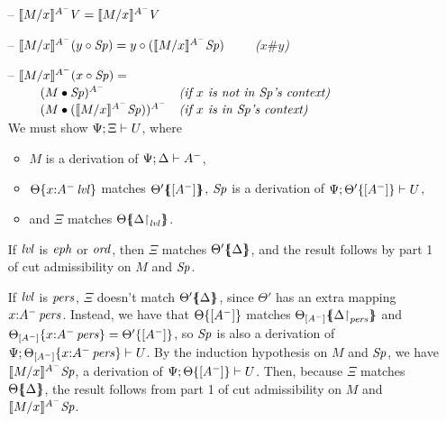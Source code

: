\begin{itemize}
\item[--] $\rsubsta{M}{x}{\tfocusr{V}}{A^-} 
           = \tfocusr{\rsubsta{M}{x}{V}{A^-}}$
\item[--] $\rsubsta{M}{x}{(\tfocusl{y}{\Sp})}{A^-} 
           = \tfocusl{y}{(\rsubsta{M}{x}{\Sp}{A^-})} \qquad$ {\it ($x \# y$)}
\item[--] $\rsubsta{M}{x}{(\tfocusl{x}{\Sp})}{A^-} =$\\
    $\begin{array}{ll}
    \qquad (\subst{M}{\Sp})^{A^-}
     & \mbox{\it (if $x$ is not in $\Sp$'s context)}\\
    \qquad (\subst{M}{(\rsubsta{M}{x}{\Sp}{A^-})})^{A^-}
     & \mbox{\it (if $x$ is in $\Sp$'s context)}
    \end{array}$\smallskip\\
  We must show $\foc{\Psi}{\Xi}{U}$, where
  \begin{itemize}
  \item $M$ is a derivation of $\foc{\Psi}{\Delta}{A^-}$, 
  \item $\tackon{\Theta}{x{:}\islvl{A^-}}$ matches
     $\frameoff{\Theta'}{[A^-]}$, 
     $\Sp$ is a derivation of 
     $\foc{\Psi}{\tackon{\Theta'}{[A^-]}}{U}$,
  \item and $\Xi$ matches $\frameoff{\Theta}{\restrictto{\Delta}{\mlvl}}$.
  \end{itemize}
  If $\mlvl$ is $\meph$ or $\mtrue$, then 
  $\Xi$ matches $\frameoff{\Theta'}{\Delta}$, and the result follows by
  part 1 of cut admissibility on $M$ and $\Sp$. 

  If $\mlvl$ is $\mpers$, $\Xi$ doesn't match $\frameoff{\Theta'}{\Delta}$,
  since $\Theta'$ has an extra mapping $x{:}\ispers{A^-}$. Instead,
  we have that 
    $\tackon{\Theta}{[A^-]}$ matches 
   $\frameoff{\Theta_{[A^-]}}{\restrictto{\Delta}{\mpers}}$
  and $\tackon{\Theta_{[A^-]}}{x{:}\ispers{A^-}} = \tackon{\Theta'}{[A^-]}$,
  so $\Sp$ is also a derivation of 
  $\foc{\Psi}{\tackon{\Theta_{[A^-]}}{x{:}\ispers{A^-}}}{U}$. 
  By the induction hypothesis on $M$ and $\Sp$, we have 
  $\rsubsta{M}{x}{\Sp}{A^-}$, a derivation of 
  $\foc{\Psi}{\tackon{\Theta}{[A^-]}}{U}$. Then, because
  $\Xi$ matches $\frameoff{\Theta}{\Delta}$, the result follows
  from part 1 of cut admissibility on $M$ and $\rsubsta{M}{x}{\Sp}{A^-}$.
  
 


\end{itemize}
